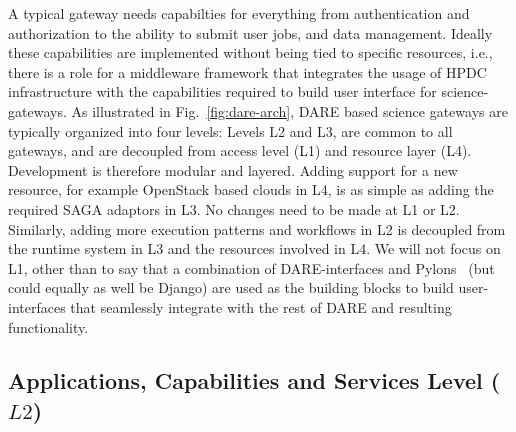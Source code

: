 \documentclass[]{svjour3}
\begin{document}
A typical gateway needs capabilties for everything from authentication
and authorization to the ability to submit user jobs, and data
management.  Ideally these capabilities are implemented without being
tied to specific resources, i.e., there is a role for a middleware
framework that integrates the usage of HPDC infrastructure with the
capabilities required to build user interface for science-gateways.
As illustrated in Fig.~\ref{fig:dare-arch}, DARE based science
gateways are typically organized into four levels: Levels L2 and L3,
are common to all gateways, and are decoupled from access level (L1)
and resource layer (L4). Development is therefore modular and
layered. Adding support for a new resource, for example OpenStack
based clouds in L4, is as simple as adding the required SAGA adaptors
in L3. No changes need to be made at L1 or L2. Similarly, adding more
execution patterns and workflows in L2 is decoupled from the runtime
system in L3 and the resources involved in L4.  We will not focus on
L1, other than to say that a combination of DARE-interfaces and
Pylons~\cite{pylons_website} (but could equally as well be Django) are
used as the building blocks to build user-interfaces that seamlessly
integrate with the rest of DARE and resulting functionality.





\subsection{Applications, Capabilities and Services Level ($L2$)} 
\end{document}

